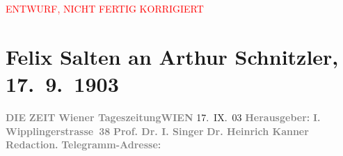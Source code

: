 
\begin{center}
            \textcolor{red}{ENTWURF, NICHT FERTIG KORRIGIERT}
                      \end{center}
            
         
         \renewcommand{\erwaehntePersonen}{Personen: Heinrich Kanner, Ottilie Salten, Olga Schnitzler, Heinrich Schnitzler, Isidor Singer}
         \renewcommand{\erwaehnteInstitutionen}{Institutionen: Die Zeit}
         \renewcommand{\erwaehnteOrte}{Orte: Edmund-Weiß-Gasse, Frankgasse, Wien, Wipplingerstraße}
         \renewcommand{\erwaehnteWerke}{}
               \section[Felix Salten an Arthur Schnitzler, 17. 9. 1903]{ Felix Salten an Arthur Schnitzler, 17. 9. 1903}\nopagebreak{}\rehead{ }\begin{ledgroupsized}[t]{13cm}\normalsize\beginnumbering \toendnotes[C]{\smallbreak\pagebreak[2]} 
\toendnotes[C]{\smallbreak}\pstart
           \noindent{}{\pb}\textcolor{gray}{\textbf{DIE}}\pend
           \pstart
           \textcolor{gray}{\textbf{ZEIT}}\pend
           \pstart
           \textcolor{gray}{\textbf{Wiener
                        Tageszeitung}}\hfill \textcolor{gray}{\textbf{WIEN}}{ }17. IX. 03\pend
           \pstart
           \textcolor{gray}{\textbf{Herausgeber: }}\hfill \textcolor{gray}{\textbf{I.
                           Wipplingerstrasse 38}}\pend
           \pstart
           \textcolor{gray}{\textbf{Prof. Dr. I. Singer}}\pend
           \pstart
           \textcolor{gray}{\textbf{Dr. Heinrich Kanner}}\pend
           \pstart
           \textcolor{gray}{\textbf{Redaction.}}\pend
           \pstart
           \textcolor{gray}{\textbf{Telegramm-Adresse: \so{,{ }}}}\pend

\end{ledgroupsized}
